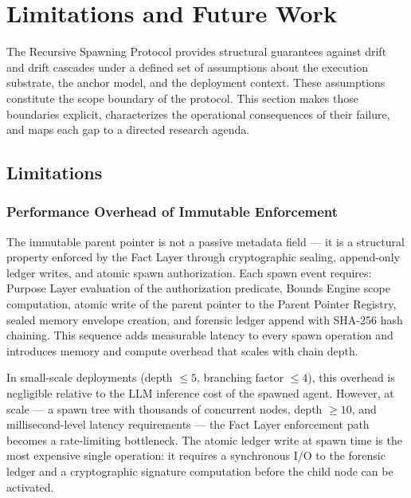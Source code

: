 \section{Limitations and Future Work}
\label{sec:limitations}

The Recursive Spawning Protocol provides structural guarantees against drift and drift cascades under a defined set of assumptions about the execution substrate, the anchor model, and the deployment context. These assumptions constitute the scope boundary of the protocol. This section makes those boundaries explicit, characterizes the operational consequences of their failure, and maps each gap to a directed research agenda.

\subsection{Limitations}
\label{sec:limitations:subsection}

\subsubsection{Performance Overhead of Immutable Enforcement}
\label{sec:performance-overhead}

The immutable parent pointer is not a passive metadata field — it is a structural property enforced by the Fact Layer through cryptographic sealing, append-only ledger writes, and atomic spawn authorization. Each spawn event requires: Purpose Layer evaluation of the authorization predicate, Bounds Engine scope computation, atomic write of the parent pointer to the Parent Pointer Registry, sealed memory envelope creation, and forensic ledger append with SHA-256 hash chaining. This sequence adds measurable latency to every spawn operation and introduces memory and compute overhead that scales with chain depth.

In small-scale deployments (depth $\leq 5$, branching factor $\leq 4$), this overhead is negligible relative to the LLM inference cost of the spawned agent. However, at scale — a spawn tree with thousands of concurrent nodes, depth $\geq 10$, and millisecond-level latency requirements — the Fact Layer enforcement path becomes a rate-limiting bottleneck. The atomic ledger write at spawn time is the most expensive single operation: it requires a synchronous I/O to the forensic ledger and a cryptographic signature computation before the child node can be activated.

